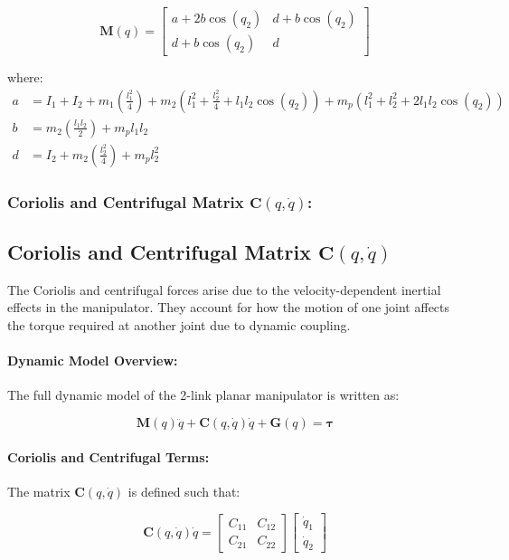 \documentclass[a4paper,12pt]{article}
\begin{document}
\[
\mathbf{M}(q) =
\begin{bmatrix}
a + 2b \cos(q_2) & d + b \cos(q_2) \\
d + b \cos(q_2) & d
\end{bmatrix}
\]

where:
\begin{align*}
a &= I_1 + I_2 + m_1 \left(\frac{l_1^2}{4}\right) + m_2 \left(l_1^2 + \frac{l_2^2}{4} + l_1 l_2 \cos(q_2) \right) + m_p \left(l_1^2 + l_2^2 + 2 l_1 l_2 \cos(q_2)\right) \\
b &= m_2 \left(\frac{l_1 l_2}{2}\right) + m_p l_1 l_2 \\
d &= I_2 + m_2 \left(\frac{l_2^2}{4}\right) + m_p l_2^2
\end{align*}

\subsubsection*{Coriolis and Centrifugal Matrix $\mathbf{C}(q, \dot{q})$:}

\subsection*{Coriolis and Centrifugal Matrix $\mathbf{C}(q, \dot{q})$}

The Coriolis and centrifugal forces arise due to the velocity-dependent inertial effects in the manipulator. They account for how the motion of one joint affects the torque required at another joint due to dynamic coupling.

\paragraph{Dynamic Model Overview:}

The full dynamic model of the 2-link planar manipulator is written as:

\[
\mathbf{M}(q)\ddot{q} + \mathbf{C}(q, \dot{q})\dot{q} + \mathbf{G}(q) = \boldsymbol{\tau}
\]

\paragraph{Coriolis and Centrifugal Terms:}

The matrix $\mathbf{C}(q, \dot{q})$ is defined such that:

\[
\mathbf{C}(q, \dot{q})\dot{q} =
\begin{bmatrix}
C_{11} & C_{12} \\
C_{21} & C_{22}
\end{bmatrix}
\begin{bmatrix}
\dot{q}_1 \\
\dot{q}_2
\end{bmatrix}
\]
\end{document}
